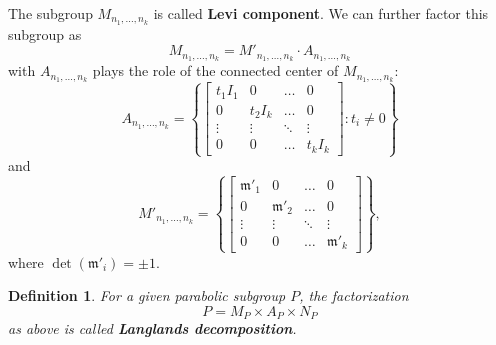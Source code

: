 \documentclass[12pt]{article} %
\newtheorem{definition}{Definition}[section]
\begin{document}
The subgroup $M_{n_1,\ldots, n_k}$ is called \textbf{Levi component}. We can further factor this subgroup as
\[M_{n_1,\ldots, n_k} = M'_{n_1,\ldots, n_k} \cdot A_{n_1,\ldots, n_k}\]
with $A_{n_1,\ldots, n_k}$ plays the role of the connected center of $M_{n_1,\ldots, n_k}$:
\[A_{n_1,\ldots, n_k} = \left\lbrace \begin{bmatrix}
        t_1I_1 & 0      & \ldots & 0      \\
        0      & t_2I_k & \ldots & 0      \\
        \vdots & \vdots & \ddots & \vdots \\
        0      & 0      & \ldots & t_kI_k
    \end{bmatrix} : t_i \ne 0\right\rbrace \]
and
\[M'_{n_1,\ldots, n_k} = \left\lbrace \begin{bmatrix}
        \mathfrak{m}'_1 & 0               & \ldots & 0               \\
        0               & \mathfrak{m}'_2 & \ldots & 0               \\
        \vdots          & \vdots          & \ddots & \vdots          \\
        0               & 0               & \ldots & \mathfrak{m}'_k
    \end{bmatrix} \right\rbrace,\]
where $\det(\mathfrak{m}'_i) = \pm 1$.
\begin{definition}
    For a given parabolic subgroup $P$, the factorization
    \[P = M_P \times A_P \times N_P\]
    as above is called \textbf{Langlands decomposition}.
\end{definition}
\end{document}
